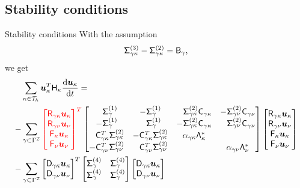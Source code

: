 \documentclass{beamer}
\begin{document}
\subsection{Stability conditions}
\begin{frame} {Stability conditions}
    With the assumption
    \begin{equation*}
    \mathsf{\Sigma}_{\gamma\kappa}^{(3)} - \mathsf{\Sigma}_{\gamma\kappa}^{(2)} = \mathsf{B}_{\gamma},
    \end{equation*}
    we get
    \small
    \begin{equation*}
    \begin{aligned}
     &\sum_{\kappa\in \fnc{T}_h}\Ukp^T \Hk \frac{\diff \Ukp}{\diff t} = \\
    -& \sum_{\gamma \subset \Gamma^{\fnc{I}}}
    {\color{red}\begin{bmatrix} \Rgk \Ukp \\ \Rgn \Unu \\ \Gk \Ukp \\ \Gn \Unu
    \end{bmatrix}^{T}} 
    \setlength{\arraycolsep}{5pt}
    \begin{bmatrix} 
    \phnt{-}\Siggam{1} & -\Siggam{1} & \phnt{-}\Siggk{2} \Cgk & -\Siggn{2}\Cgn \\
    -\Siggam{1} & \phnt{-}\Siggam{1} & -\Siggk{2}\Cgk & \phnt{-}\Siggn{2}\Cgn \\
    \phnt{-}\Cgk^T\Siggk{2} & -\Cgk^{T}\Siggk{2} & \alpha_{\gamma \kappa}\Lam_{\kappa}^{*} &  \\
    -\Cgn^T\Siggn{2} & \phnt{-}\Cgn^{T}\Siggn{2} &  & \alpha_{\gamma \nu} \Lam_{\nu}^{*}   
    \end{bmatrix}
    \begin{bmatrix} \Rgk \Ukp \\ \Rgn \Unu \\ \Gk \Ukp \\ \Gn \Unu
    \end{bmatrix} \\
    -& \sum_{\gamma \subset \Gamma^{\fnc{I}}}
    \begin{bmatrix} \Dgk \Ukp \\ \Dgn \Unu \end{bmatrix}^T
    \begin{bmatrix} \Siggam{4} & \Siggam{4} \\ \Siggam{4} & \Siggam{4} \end{bmatrix}
    \begin{bmatrix} \Dgk \Ukp \\ \Dgn \Unu \end{bmatrix} \\

\end{aligned}
\end{equation*}
\end{frame}
\end{document}

